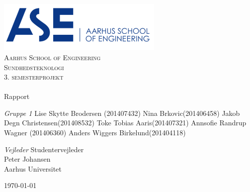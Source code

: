 \begin{titlingpage}
\begin{center}

~ \\[3cm]


\includegraphics[width=0.6\textwidth]{Figurer/ASE}\\[1cm]

\textsc{\LARGE Aarhus School of Engineering}\\[1.5cm]

\textsc{\Large Sundhedsteknologi}\\
\textsc{\Large 3. semesterprojekt}\\[0.5cm]

\noindent\makebox[\linewidth]{\rule{\textwidth}{0.4pt}}\\
[0.5cm]{\Huge Rapport}
\noindent\makebox[\linewidth]{\rule{\textwidth}{0.4pt}}

\end{center}

\textit{Gruppe 1} \newline
Lise Skytte Brodersen (201407432) \newline
Nina Brkovic(201406458) \newline
Jakob Degn Christensen(201408532) \newline
Toke Tobias Aaris(201407321) \newline		 
Annsofie Randrup Wagner (201406360) \newline 
Anders Wiggers Birkelund(201404118) \newline


\textit{Vejleder} \newline
Studentervejleder\\
Peter Johansen\\
Aarhus Universitet


\vfill

\begin{center}
{\large \today}
\end{center}


\end{titlingpage}